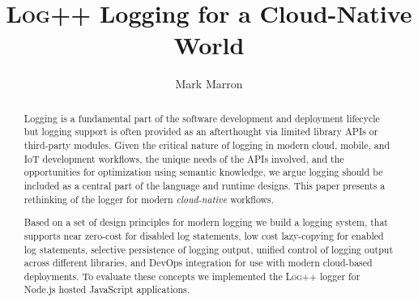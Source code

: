 \documentclass[sigplan,10pt,review]{acmart}
\newcommand{\projn}{\textsc{Log++}\xspace}
\newcommand{\ourtitle}{\projn Logging for a Cloud-Native World}
\begin{document}

\acmISBN{} %
\acmDOI{} %




\title{\ourtitle}

\author{Mark Marron}

\begin{abstract} 
Logging is a fundamental part of the software development and
deployment lifecycle but logging support is often provided as an afterthought 
via limited library APIs or third-party modules. Given the critical
nature of logging in modern cloud, mobile, and IoT development workflows, the unique needs of the APIs involved,
and the opportunities for optimization using semantic knowledge, we argue logging should
be included as a central part of the language and runtime designs. This paper
presents a rethinking of the logger for modern \emph{cloud-native} workflows. 

Based on a set of design principles for modern logging we build a logging system,
that supports near zero-cost for disabled log statements, low cost lazy-copying 
for enabled log statements, selective persistence of logging output, unified control 
of logging output across different libraries, and DevOps integration for use with 
modern cloud-based deployments. To evaluate these concepts we implemented the \projn 
logger for Node.js hosted JavaScript applications.
\end{abstract}

\maketitle
\end{document}
